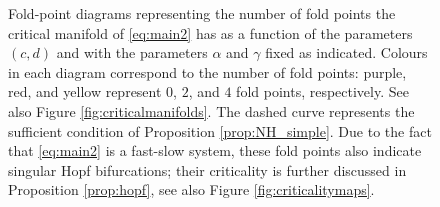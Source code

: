 \documentclass[3p]{elsarticle}
\theoremstyle{plain}
\theoremstyle{remark}
\theoremstyle{definition}
\begin{document}
\begin{figure}[htbp]
\begin{tikzpicture}
    \end{tikzpicture}
 
    \caption{Fold-point diagrams representing the number of fold points the critical manifold of \eqref{eq:main2} has as a function of the parameters $(c,d)$ and with the parameters $\alpha$ and $\gamma$ fixed as indicated. Colours in each diagram correspond to the number of fold points: purple, red, and yellow represent $0$, $2$, and $4$ fold points, respectively. See also Figure \ref{fig:criticalmanifolds}. The dashed curve represents the sufficient condition of Proposition \ref{prop:NH_simple}. Due to the fact that \eqref{eq:main2} is a fast-slow system, these fold points also indicate singular Hopf bifurcations; their criticality is further discussed in Proposition \ref{prop:hopf}, see also Figure \ref{fig:criticalitymaps}.}
    \label{fig:fold-diagrams}
\end{figure}
\end{document}
